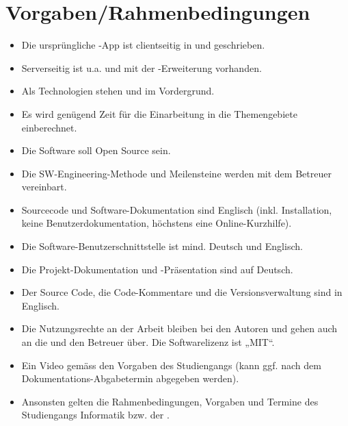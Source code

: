 \section*{Vorgaben/Rahmenbedingungen}
\begin{itemize}
	\item Die ursprüngliche \kort{}-App ist clientseitig in  und  geschrieben.
	\item Serverseitig ist u.a.  und  mit der -Erweiterung vorhanden.
	\item Als Technologien stehen  und  im Vordergrund.
	\item Es wird genügend Zeit für die Einarbeitung in die Themengebiete einberechnet.
	\item Die Software soll Open Source sein.
	\item Die SW-Engineering-Methode und Meilensteine werden mit dem Betreuer vereinbart.
	\item Sourcecode und Software-Dokumentation sind Englisch (inkl. Installation, keine Benutzerdokumentation, höchstens eine Online-Kurzhilfe).
	\item Die Software-Benutzerschnittstelle ist mind. Deutsch und Englisch.
	\item Die Projekt-Dokumentation und -Präsentation sind auf Deutsch. 
	\item Der Source Code, die Code-Kommentare und die Versionsverwaltung sind in Englisch.
	\item Die Nutzungsrechte an der Arbeit bleiben bei den Autoren und gehen auch an die  und den Betreuer über. Die Softwarelizenz ist „MIT“.
	\item Ein Video gemäss den Vorgaben des Studiengangs (kann ggf. nach dem Dokumentations-Abgabetermin abgegeben werden).
	\item Ansonsten gelten die Rahmenbedingungen, Vorgaben und Termine des Studiengangs Informatik bzw. der .
\end{itemize}

